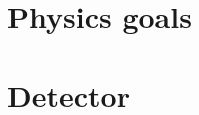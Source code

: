 
\section{Physics goals}
\label{chap:intro:lhcb:physics}

\section{Detector}
\label{chap:intro:lhcb:detector}
